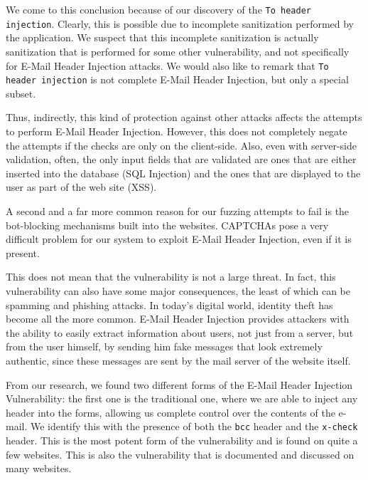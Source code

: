 	We come to this conclusion because of our discovery of the \texttt{To header injection}. Clearly, this is possible due to incomplete sanitization performed by the application. We suspect that this incomplete sanitization is actually sanitization that is performed for some other vulnerability, and not specifically for E-Mail Header Injection attacks. We would also like to remark that \texttt{To header injection} is not complete E-Mail Header Injection, but only a special subset.
	
    Thus, indirectly, this kind of protection against other attacks affects the attempts to perform E-Mail Header Injection. However, this does not completely negate the attempts if the checks are only on the client-side. Also, even with server-side validation, often, the only input fields that are validated are ones that are either inserted into the database (SQL Injection) and the ones that are displayed to the user as part of the web site (XSS).

	A second and a far more common reason for our fuzzing attempts to fail is the bot-blocking mechanisms built into the websites. CAPTCHAs pose a very difficult problem for our system to exploit E-Mail Header Injection, even if it is present.

	This does not mean that the vulnerability is not a large threat. In fact, this vulnerability can also have some major consequences, the least of which can be spamming and phishing attacks.
	In today's digital world, identity theft has become all the more common. E-Mail Header Injection provides attackers with the ability to easily extract information about users, not just from a server, but from the user himself, by sending him fake messages that look extremely authentic, since these messages are sent by the mail server of the website itself.
    
    From our research, we found two different forms of the E-Mail Header Injection Vulnerability: the first one is the traditional one, where we are able to inject any header into the forms, allowing us complete control over the contents of the e-mail. We identify this with the presence of both the \texttt{bcc} header and the \texttt{x-check} header. This is the most potent form of the vulnerability and is found on quite a few websites. This is also the vulnerability that is documented and discussed on many websites.
    
